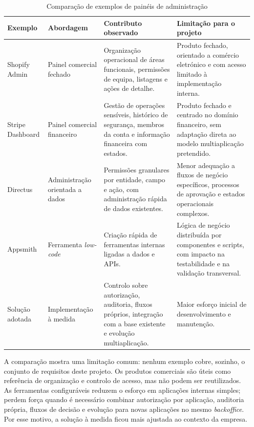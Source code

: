 \begin{table}[H]
\caption{Comparação de exemplos de painéis de administração}
\label{tab:comparacao_abordagens_backoffice}
\begin{center}
\footnotesize
\begin{tabular}{|p{2.5cm}|p{2.6cm}|p{3.8cm}|p{3.9cm}|}
\hline
\textbf{Exemplo} & \textbf{Abordagem} & \textbf{Contributo observado} & \textbf{Limitação para o projeto} \\ \hline
Shopify Admin & Painel comercial fechado & Organização operacional de áreas funcionais, permissões de equipa, listagens e ações de detalhe. & Produto fechado, orientado a comércio eletrónico e com acesso limitado à implementação interna. \\ \hline
Stripe Dashboard & Painel comercial financeiro & Gestão de operações sensíveis, histórico de segurança, membros da conta e informação financeira com estados. & Produto fechado e centrado no domínio financeiro, sem adaptação direta ao modelo multiaplicação pretendido. \\ \hline
Directus & Administração orientada a dados & Permissões granulares por entidade, campo e ação, com administração rápida de dados existentes. & Menor adequação a fluxos de negócio específicos, processos de aprovação e estados operacionais complexos. \\ \hline
Appsmith & Ferramenta \textit{low-code} & Criação rápida de ferramentas internas ligadas a dados e \glspl{API}. & Lógica de negócio distribuída por componentes e scripts, com impacto na testabilidade e na validação transversal. \\ \hline
Solução adotada & Implementação à medida & Controlo sobre autorização, auditoria, fluxos próprios, integração com a base existente e evolução multiaplicação. & Maior esforço inicial de desenvolvimento e manutenção. \\ \hline
\end{tabular}
\end{center}
\end{table}

A comparação mostra uma limitação comum: nenhum exemplo cobre, sozinho, o conjunto de requisitos deste projeto. Os produtos comerciais são úteis como referência de organização e controlo de acesso, mas não podem ser reutilizados. As ferramentas configuráveis reduzem o esforço em aplicações internas simples; perdem força quando é necessário combinar autorização por aplicação, auditoria própria, fluxos de decisão e evolução para novas aplicações no mesmo \textit{backoffice}. Por esse motivo, a solução à medida ficou mais ajustada ao contexto da empresa.

